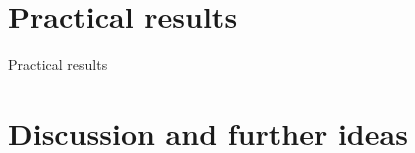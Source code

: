 \documentclass[12pt]{article}
\begin{document}
\section{Practical results}

\begin{table}
\begin{center}



\caption{Practical results}\label{table:practical}
\end{center}
\end{table}



\section{Discussion and further ideas}

%





\end{document}

